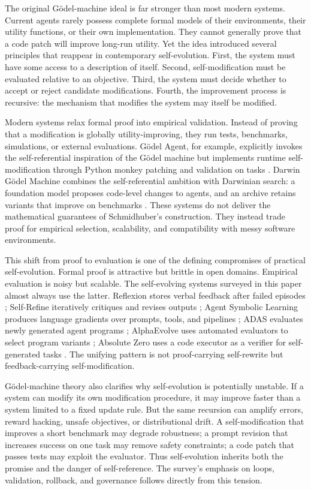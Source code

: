 The original G{\"o}del-machine ideal is far stronger than most modern systems. Current agents rarely possess complete formal models of their environments, their utility functions, or their own implementation. They cannot generally prove that a code patch will improve long-run utility. Yet the idea introduced several principles that reappear in contemporary self-evolution. First, the system must have some access to a description of itself. Second, self-modification must be evaluated relative to an objective. Third, the system must decide whether to accept or reject candidate modifications. Fourth, the improvement process is recursive: the mechanism that modifies the system may itself be modified.

Modern systems relax formal proof into empirical validation. Instead of proving that a modification is globally utility-improving, they run tests, benchmarks, simulations, or external evaluations. G{\"o}del Agent, for example, explicitly invokes the self-referential inspiration of the G{\"o}del machine but implements runtime self-modification through Python monkey patching and validation on tasks \cite{yin2024godel}. Darwin G{\"o}del Machine combines the self-referential ambition with Darwinian search: a foundation model proposes code-level changes to agents, and an archive retains variants that improve on benchmarks \cite{darwingodelmachine2025}. These systems do not deliver the mathematical guarantees of Schmidhuber's construction. They instead trade proof for empirical selection, scalability, and compatibility with messy software environments.

This shift from proof to evaluation is one of the defining compromises of practical self-evolution. Formal proof is attractive but brittle in open domains. Empirical evaluation is noisy but scalable. The self-evolving systems surveyed in this paper almost always use the latter. Reflexion stores verbal feedback after failed episodes \cite{reflexion2023}; Self-Refine iteratively critiques and revises outputs \cite{selfrefine2023}; Agent Symbolic Learning produces language gradients over prompts, tools, and pipelines \cite{agentsymboliclearning2024}; ADAS evaluates newly generated agent programs \cite{adas2025}; AlphaEvolve uses automated evaluators to select program variants \cite{alphaevolve2025}; Absolute Zero uses a code executor as a verifier for self-generated tasks \cite{absolutezero2025}. The unifying pattern is not proof-carrying self-rewrite but feedback-carrying self-modification.

G{\"o}del-machine theory also clarifies why self-evolution is potentially unstable. If a system can modify its own modification procedure, it may improve faster than a system limited to a fixed update rule. But the same recursion can amplify errors, reward hacking, unsafe objectives, or distributional drift. A self-modification that improves a short benchmark may degrade robustness; a prompt revision that increases success on one task may remove safety constraints; a code patch that passes tests may exploit the evaluator. Thus self-evolution inherits both the promise and the danger of self-reference. The survey's emphasis on loops, validation, rollback, and governance follows directly from this tension.


